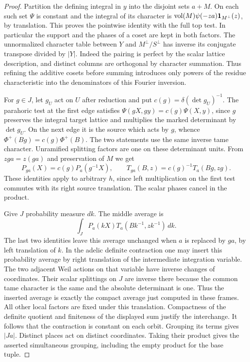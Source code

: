 \documentclass[a4paper,11pt]{article}
\theoremstyle{definition}
\theoremstyle{remark}
\numberwithin{equation}{section}
\begin{document}
\begin{proof}
Partition the defining integral in \(y\) into the disjoint
sets \(a+M\). On each such set \(\Psi\) is constant and
the integral of its character is
\({\rm vol}(M)\psi(-za)\mathbf1_{M^\perp}(z)\), by translation.
This proves the pointwise identity with the full top test.
In particular the support and the phases of a coset are
kept in both factors. The unnormalized character table
between \(Y\) and \(M^\perp/S^\perp\) has inverse its
conjugate transpose divided by \(|Y|\). Indeed the pairing
is perfect by the scalar lattice description, and distinct
columns are orthogonal by character summation. Thus refining
the additive cosets before summing introduces only powers
of the residue characteristic into the denominators of this
Fourier inversion.

For \(g\in J\), let \(g_U\) act on \(U\) after reduction
and put \(c(g)=\delta(\det g_U)^{-1}\). The parahoric test
at the first edge satisfies
\(\Psi(gX,gy)=c(g)\Psi(X,y)\), since \(g\) preserves the
integral target lattice and multiplies the marked determinant
by \(\det g_U\). On the next edge it is the source which acts
by \(g\), whence \(\Phi^+(Bg)=c(g)\Phi^+(B)\).
The two statements use the same inverse tame character.
Unramified splitting factors are one on these determinant
units. From \(zga=z(ga)\) and preservation of \(M\) we get
\[
 P_{ga}(X)=c(g)P_a(g^{-1}X),\qquad
 T_{ga}(B,z)=c(g)^{-1}T_a(Bg,zg).
\]
These identities apply to arbitrary \(h\), since left
multiplication on the first test commutes with its right
source translation. The scalar phases cancel in the product.

Give \(J\) probability measure \(dk\). The middle average is
\[
       \int_J P_a(kX)T_a(Bk^{-1},zk^{-1})\,dk .
\]
The last two identities leave this average unchanged when
\(a\) is replaced by \(ga\), by left translation of \(k\).
In the adelic definite contraction one may insert this
probability average by right translation of the intermediate
integration variable. The two adjacent Weil actions on that
variable have inverse changes of coordinates. Their scalar
splittings on \(J\) are inverse there because the common
tame character is the same and the absolute determinant
is one. Thus the inserted average is exactly the compact
average just computed in these frames. All other local
factors are fixed under this translation. Compactness of
the definite quotient and finiteness of the displayed sum
justify the interchange. It follows that the contraction is
constant on each orbit. Grouping its terms gives \(|Ja|\).
Distinct places act on distinct coordinates. Taking their
product gives the asserted simultaneous grouping, including
the empty product for the base tuple.


\end{proof}
\end{document}
